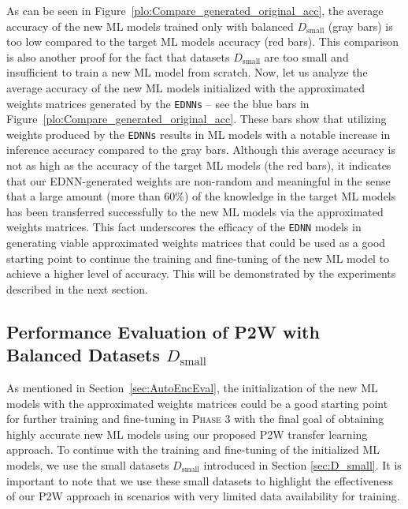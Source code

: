 \documentclass[letterpaper]{article}
\begin{document}
As can be seen in Figure~\ref{plo:Compare_generated_original_acc}, the average accuracy of the new ML models trained only with balanced $D_{\text{small}}$ (gray bars) is too low compared to the target ML models accuracy (red bars). This comparison is also another proof for the fact that datasets $D_{\text{small}}$ are too small and insufficient to train a new ML model from scratch. Now, let us analyze the average accuracy of the new ML models initialized with the approximated weights matrices generated by the \texttt{EDNNs} -- see the blue bars in  Figure~\ref{plo:Compare_generated_original_acc}. These bars show that utilizing weights produced by the \texttt{EDNNs} results in ML models with a notable increase in inference accuracy compared to the gray bars. Although this average accuracy is not as high as the accuracy of the target ML models (the red bars), it indicates that our EDNN-generated weights are non-random and meaningful in the sense that a large amount (more than 60\%) of the knowledge in the target ML models has been transferred successfully to the new ML models via the approximated weights matrices. This fact underscores the efficacy of the \texttt{EDNN} models in generating viable approximated weights matrices that could be used as a good starting point to continue the training and fine-tuning of the new ML model to achieve a higher level of accuracy. This will be demonstrated by the experiments described in the next section.

\subsection{Performance Evaluation of P2W with \\ Balanced Datasets $D_{\text{small}}$}
\label{sec:NewMLEval}

As mentioned in Section~\ref{sec:AutoEncEval}, the initialization of the new ML models with the approximated weights matrices could be a good starting point for further training and fine-tuning in \textsc{Phase 3} with the final goal of obtaining highly accurate new ML models using our proposed P2W transfer learning approach. To continue with the training and fine-tuning of the initialized ML models, we use the small datasets $D_{\text{small}}$ introduced in Section \ref{sec:D_small}. It is important to note that we use these small datasets to highlight the effectiveness of our P2W approach in scenarios with very limited data availability for training. 
\end{document}
